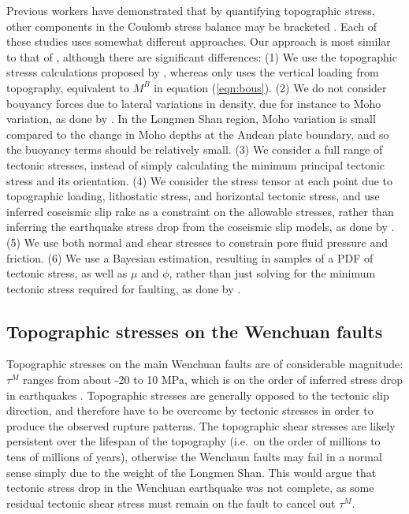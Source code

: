 \documentclass[draft,jgrga]{AGUTeX}
\begin{document}
\begin{article}
Previous workers have demonstrated that by quantifying topographic
stress, other components in the Coulomb stress balance may be bracketed
\citep[e.g.,][]{cattin1997, lamb2006, luttrell2011}. Each of these studies
uses somewhat different approaches. Our approach is most similar to that
of \citet{luttrell2011}, although there are significant
differences: (1) We use the topographic stresss calculations proposed by
\citet{liuzoback1992}, whereas 
\citet{luttrell2011} only uses the vertical loading from topography,
equivalent to $M^B$ in equation (\ref{eqn:bous}). (2) We do not consider
bouyancy forces due to lateral variations in density, due for instance to
Moho variation, as done by \citet{luttrell2011}. In the
Longmen Shan region, Moho variation is small compared to the change in
Moho depths at the Andean plate boundary, and so the buoyancy terms
should be relatively small. (3) We consider a full range of tectonic
stresses, instead of simply calculating the minimum principal tectonic
stress and its orientation. (4) We consider the stress tensor at each
point due to topographic loading, lithostatic stress, and horizontal
tectonic stress, and use inferred coseismic slip rake as a constraint on
the allowable stresses, rather than inferring the earthquake stress drop
from the coseismic slip models, as done by 
\citet{luttrell2011}. (5) We use both normal and shear stresses to
constrain pore fluid pressure and friction. (6) We use a Bayesian
estimation, resulting in samples of a PDF of tectonic stress, as well as $\mu$ and
$\phi$, rather than just solving for the minimum tectonic stress
required for faulting, as done by \citet{luttrell2011}.

\subsection{Topographic stresses on the Wenchuan
faults}\label{topographic-stresses-on-the-wenchuan-faults}

Topographic stresses on the main Wenchuan faults are of considerable
magnitude: $\tau^M$ ranges from about -20 to 10 MPa, which is on the
order of inferred stress drop in earthquakes \citep[e.g.,][]{kanamori1975,
allmann2009}. Topographic stresses are
generally opposed to the tectonic slip direction, and therefore have to
be overcome by tectonic stresses in order to produce the observed
rupture patterns. The topographic shear stresses are likely persistent
over the lifespan of the topography (i.e.~on the order of millions to
tens of millions of years), otherwise the Wenchaun faults may fail in a
normal sense simply due to the weight of the Longmen Shan. This would
argue that tectonic stress drop in the Wenchuan earthquake was not
complete, as some residual tectonic shear stress must remain on the
fault to cancel out $\tau^M$.


\end{article}
\end{document}
